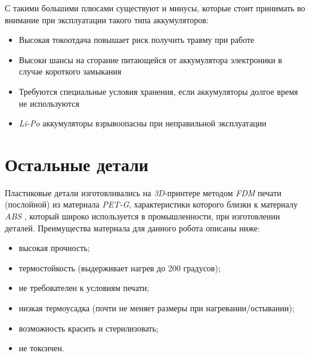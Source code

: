 С такими большими плюсами существуют и минусы, которые стоит принимать во внимание при эксплуатации такого типа аккумуляторов:
\begin{itemize}
    \item Высокая токоотдача повышает риск получить травму при работе
    \item Высоки шансы на сгорание питающейся от аккумулятора электроники в случае короткого замыкания
    \item Требуются специальные условия хранения, если аккумуляторы долгое время не используются
    \item \textit{Li-Po} аккумуляторы взрывоопасны при неправильной эксплуатации
\end{itemize}


\section{Остальные детали}
Пластиковые детали изготовливались на \textit{3D}-принтере методом \textit{FDM} печати (послойной) из материала \textit{PET-G}, характеристики которого близки к материалу \textit{ABS} \cite{Filament2017}, который широко используется в промышленности, при изготовлении деталей. Преимущества материала для данного робота описаны ниже:
\begin{itemize}
    \item высокая прочность; 
    \item термостойкость (выдерживает нагрев до 200 градусов);
    \item не требователен к условиям печати;
    \item низкая термоусадка (почти не меняет размеры при нагревании/остывании);
    \item возможность красить и стерилизовать;
    \item не токсичен.
\end{itemize}
